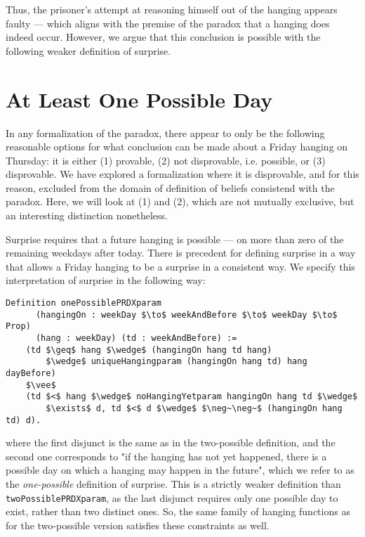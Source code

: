 \documentclass[runningheads]{llncs}
\begin{document}
Thus, the prisoner's attempt at reasoning himself out
of the hanging appears faulty --- which aligns with the premise of the
paradox that a hanging does indeed occur. However, we argue that this conclusion
is possible with the following weaker definition of surprise.

\section{At Least One Possible Day}
\label{sec:one}

In any formalization of the paradox, there appear to only be the following reasonable
options for what conclusion
can be made about a Friday hanging on Thursday: it is either (1) provable,
(2) not disprovable, i.e. possible, or (3) disprovable.
We have explored a formalization where it is disprovable, and for this reason,
excluded from the domain of definition of beliefs consistend with the paradox.
Here, we will look at
(1) and (2), which are not mutually exclusive, but an interesting distinction nonetheless.

Surprise requires that a future hanging is possible --- on more than zero
of the remaining weekdays after today. There is precedent \cite{fourpossible}
for defining surprise
in a way that allows a Friday hanging to be a surprise in a consistent way.
We specify this interpretation of surprise in the following way:

\begin{lstlisting}[mathescape=true]
  Definition onePossiblePRDXparam
      (hangingOn : weekDay $\to$ weekAndBefore $\to$ weekDay $\to$ Prop)
      (hang : weekDay) (td : weekAndBefore) :=
    (td $\geq$ hang $\wedge$ (hangingOn hang td hang)
        $\wedge$ uniqueHangingparam (hangingOn hang td) hang dayBefore)
    $\vee$
    (td $<$ hang $\wedge$ noHangingYetparam hangingOn hang td $\wedge$
        $\exists$ d, td $<$ d $\wedge$ $\neg~\neg~$ (hangingOn hang td) d).
\end{lstlisting}

where the first disjunct is the same as in the two-possible definition, and
the second one corresponds to "if the hanging has not yet happened, there is a
possible day on which a hanging may happen in the future", which
  we refer to as the \emph{one-possible} definition of surprise. This is a strictly
weaker definition than {\tt twoPossiblePRDXparam}, as the last
disjunct requires only one possible day to exist, rather than two distinct ones.
So, the same family of hanging functions as for the two-possible version satisfies these
constraints as well.
\end{document}
